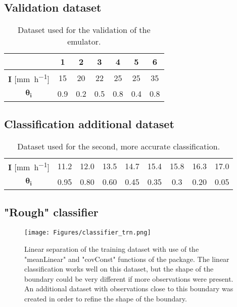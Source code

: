 \subsection{Validation dataset}
\begin{table}[H]
  \centering
  \caption{Dataset used for the validation of the emulator.}
  \label{tab:validation_dataset}
  \begin{tabular}{ccccccc}
    \toprule
     & \textbf{1} & \textbf{2} & \textbf{3} & \textbf{4} & \textbf{5} & \textbf{6} \\
    \midrule
    $\bm{I}$ {\scriptsize[\si{\milli\meter\per\hour}]} & 15  & 20  & 22  & 25  & 25  & 35\\
    $\bm{\theta_i}$                                    & 0.9 & 0.2 & 0.5 & 0.8 & 0.4 & 0.8\\
    \bottomrule
  \end{tabular}
\end{table}

\subsection{Classification additional dataset}
\begin{table}[H]
  \centering
  \caption{Dataset used for the second, more accurate classification.}
  \label{tab:classification_dataset}
  \begin{tabular}{ccccccccc}
    \toprule
    $\bm{I}$ {\scriptsize[\si{\milli\meter\per\hour}]} & 11.2  & 12.0  & 13.5  & 14.7  & 15.4  & 15.8 & 16.3 & 17.0\\
    $\bm{\theta_i}$                                    & 0.95  & 0.80  & 0.60  & 0.45  & 0.35  & 0.3  & 0.20 & 0.05\\
    \bottomrule
  \end{tabular}
\end{table}


\subsection{"Rough" classifier}
\begin{figure}[H]
  \centering
  \texttt{[image: Figures/classifier\_trn.png]}
  \caption{Linear separation of the training dataset with use of the "meanLinear" and "covConst" functions of the  package. The linear classification works well on this dataset, but the shape of the boundary could be very different if more observations were present. An additional dataset with observations close to this boundary was created in order to refine the shape of the boundary.}
  \label{fig:classifier_rough}
\end{figure}

